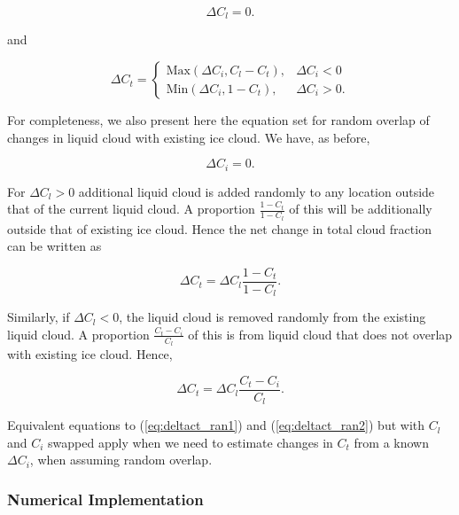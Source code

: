 \documentclass{UMDP_article}
\begin{document}
\begin{equation}
\Delta C_l = 0 .
\label{eq:deltacl_eq_0}
\end{equation}

and

\begin{equation}
\Delta C_t = \left\{ \begin{array}{ll}
            \text{Max} ( \Delta C_i , C_l - C_t ),   &  \Delta C_i < 0  \\
            \text{Min} ( \Delta C_i , 1 - C_t ),     & \Delta C_i > 0 .
             \end{array} \right.
\label{eq:deltact_min_array}
\end{equation}

For completeness, we also present here the equation set for
random overlap of changes in liquid cloud with existing ice cloud.
We have, as before,

\begin{equation}
\Delta C_i = 0 .
\label{eq:deltaci_eq_0_2}
\end{equation}

For $\Delta C_l > 0$ additional liquid cloud is added
randomly to any location outside that of the current liquid
cloud. A proportion $\frac{1-C_t}{1-C_l}$ of this will be additionally
outside that of existing ice cloud. Hence the net change in
total cloud fraction can be written as

\begin{equation}
\Delta C_t = \Delta C_l \frac{1 - C_t}{1 - C_l} .
\label{eq:deltact_ran1}
\end{equation}

Similarly, if $\Delta C_l < 0$, the liquid cloud is removed
randomly from the existing liquid cloud. A proportion
$\frac{C_t - C_i}{C_l}$ of this is from liquid cloud that does not
overlap with existing ice cloud. Hence,

\begin{equation}
\Delta C_t = \Delta C_l \frac{C_t - C_i}{C_l} .
\label{eq:deltact_ran2}
\end{equation}

Equivalent equations to (\ref{eq:deltact_ran1}) and
(\ref{eq:deltact_ran2}) but with $C_l$ and $C_i$ swapped apply when
we need to estimate changes in $C_t$ from a known $\Delta C_i$, when
assuming random overlap.

\subsubsection{Numerical Implementation}
\end{document}
